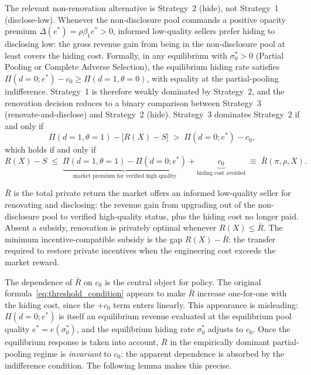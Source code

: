 \documentclass[10pt,letterpaper]{bp-template-concise}
\begin{document}
\vspace{-1em}


\noindent The relevant non-renovation alternative is Strategy~2 (hide), not Strategy~1 (disclose-low). Whenever the non-disclosure pool commands a positive opacity premium $\Delta(e^*) = \rho\beta_1 e^* > 0$, informed low-quality sellers prefer hiding to disclosing low: the gross revenue gain from being in the non-disclosure pool at least covers the hiding cost. Formally, in any equilibrium with $\sigma_0^* > 0$ (Partial Pooling or Complete Adverse Selection), the equilibrium hiding rate satisfies $\Pi(d=0;e^*) - c_0 \ge \Pi(d=1,\theta=0)$, with equality at the partial-pooling indifference. Strategy~1 is therefore weakly dominated by Strategy~2, and the renovation decision reduces to a binary comparison between Strategy~3 (renovate-and-disclose) and Strategy~2 (hide). Strategy~3 dominates Strategy~2 if and only if
\begin{equation}
    \Pi(d=1,\theta=1) - \bigl[R(X)-S\bigr]
    \;>\;
    \Pi(d=0;e^*) - c_0,
    \label{eq:threshold_condition}
\end{equation}
which holds if and only if
\[
    R(X) - S \;\leq\;
    \underbrace{\Pi(d=1,\theta=1)-\Pi(d=0;e^*)}_{\text{market premium for verified high quality}}
    +\underbrace{c_0}_{\text{hiding cost avoided}}
    \;\equiv\;
    \bar{R}(\pi,\rho,X).
\]

$\bar R$ is the total private return the market offers an informed low-quality seller for renovating and disclosing: the revenue gain from upgrading out of the non-disclosure pool to verified high-quality status, plus the hiding cost no longer paid. Absent a subsidy, renovation is privately optimal whenever $R(X) \le \bar R$. The minimum incentive-compatible subsidy is the gap $R(X) - \bar R$: the transfer required to restore private incentives when the engineering cost exceeds the market reward.

The dependence of $\bar R$ on $c_0$ is the central object for policy. The original formula~\eqref{eq:threshold_condition} appears to make $\bar R$ increase one-for-one with the hiding cost, since the $+c_0$ term enters linearly. This appearance is misleading: $\Pi(d=0;e^*)$ is itself an equilibrium revenue evaluated at the equilibrium pool quality $e^* = e(\sigma_0^*)$, and the equilibrium hiding rate $\sigma_0^*$ adjusts to $c_0$. Once the equilibrium response is taken into account, $\bar R$ in the empirically dominant partial-pooling regime is \emph{invariant} to $c_0$: the apparent dependence is absorbed by the indifference condition. The following lemma makes this precise.
\end{document}
